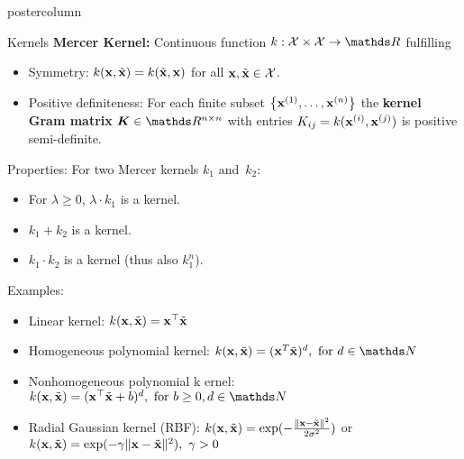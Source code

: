 \documentclass{beamer}
\begin{document}
\begin{frame}[fragile]{}
\begin{columns}
\begin{column}{.31\textwidth}
\begin{beamercolorbox}[center]{postercolumn}
\begin{minipage}{.98\textwidth}
{\begin{myblock}{Kernels}
%	
	\textbf{Mercer Kernel:} Continuous function
	$ k : \Xspace \times \Xspace \to \R $ fulfilling
%	
	\begin{itemize}
		\setlength{\itemindent}{+.3in}
	\item Symmetry: $k(\mathbf{x}, \tilde {\mathbf{x}}) = k(\tilde {\mathbf{x}}, \mathbf{x})$ for all
	$\mathbf{x}, \tilde {\mathbf{x}} \in \mathcal{X}$.
	\item Positive definiteness: For each finite subset $\left\{\mathbf{x}^{(1)}, \dots, \mathbf{x}^{(n)}\right\}$
	the \textbf{kernel Gram matrix} $\bm{K} \in \R^{n \times n}$ with entries
	$K_{ij} = k(\mathbf{x}^{(i)}, \mathbf{x}^{(j)})$ is positive semi-definite.
	\end{itemize}
%	
	Properties: For two Mercer kernels $k_1$ and~$k_2$:
%	
	\begin{itemize}
		\setlength{\itemindent}{+.3in}
		\item For $\lambda \geq 0$, $\lambda \cdot k_1$ is a kernel.
		\item $k_1 + k_2$ is a kernel.
		\item $k_1 \cdot k_2$ is a kernel (thus also $k_1^n$).
	\end{itemize}
	Examples:
	\begin{itemize}
		\setlength{\itemindent}{+.3in}
		\item Linear kernel: $k(\mathbf{x}, \tilde {\mathbf{x}}) = \mathbf{x}^\top \tilde {\mathbf{x}}$
		\item Homogeneous polynomial kernel:
		$ k(\xv, \xtil) = (\xv^T \xtil)^d, \text{ for } d \in \N$
		\item Nonhomogeneous polynomial k	ernel: $k(\xv, \tilde \xv) = (\xv^\top \tilde \xv + b)^d, \text{ for } b\geq 0, d \in \N$
		\item Radial Gaussian kernel (RBF):
		$k(\mathbf{x}, \tilde {\mathbf{x}}) = \exp(-\frac{\|\mathbf{x} - \tilde {\mathbf{x}}\|^2}{2\sigma^2})$ 
		or 
		$k(\mathbf{x}, \tilde {\mathbf{x}}) = \exp(-\gamma \|\mathbf{x} - \tilde {\mathbf{x}}\|^2), ~ \gamma>0$
	\end{itemize}
\end{myblock} 
%
%

%             


}
\end{minipage}
\end{beamercolorbox}
\end{column}
\end{columns}
\end{frame}
\end{document}
